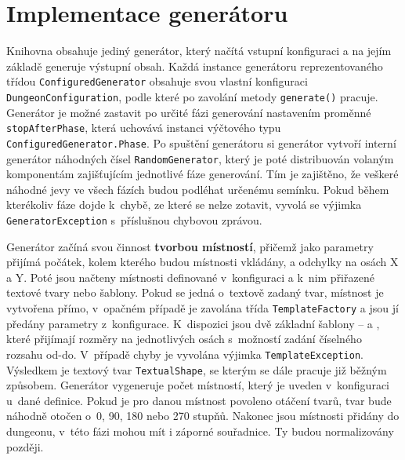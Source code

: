 
\section{Implementace generátoru}


\begin{sloppypar}
Knihovna obsahuje jediný generátor, který načítá vstupní konfiguraci a na jejím základě generuje výstupní obsah.
Každá instance generátoru reprezentovaného třídou \texttt{ConfiguredGenerator} obsahuje svou vlastní konfiguraci \texttt{DungeonConfiguration}, podle které po zavolání metody \texttt{generate()} pracuje.
Generátor je možné zastavit po určité fázi generování nastavením proměnné \texttt{stopAfterPhase}, která uchovává instanci výčtového typu \texttt{ConfiguredGenerator.Phase}.
Po spuštění generátoru si generátor vytvoří interní generátor náhodných čísel \texttt{RandomGenerator}, který je poté distribuován volaným komponentám zajišťujícím jednotlivé fáze generování.
Tím je zajištěno, že veškeré náhodné jevy ve všech fázích budou podléhat určenému semínku.
Pokud během kterékoliv fáze dojde k~chybě, ze které se nelze zotavit, vyvolá se výjimka \texttt{GeneratorException} s~příslušnou chybovou zprávou.
\end{sloppypar}
\par
Generátor začíná svou činnost \textbf{tvorbou místností}, přičemž jako parametry přijímá počátek, kolem kterého budou místnosti vkládány, a odchylky na osách X a Y.
Poté jsou načteny místnosti definované v~konfiguraci a k~nim přiřazené textové tvary nebo šablony.
Pokud se jedná o~textově zadaný tvar, místnost je vytvořena přímo, v~opačném případě je zavolána třída \texttt{TemplateFactory} a jsou jí předány parametry z~konfigurace.
K~dispozici jsou dvě základní šablony --  a , které přijímají rozměry na jednotlivých osách s~možností zadání číselného rozsahu od-do.
V~případě chyby je vyvolána výjimka \texttt{TemplateException}.
Výsledkem je textový tvar \texttt{TextualShape}, se kterým se dále pracuje již běžným způsobem.
Generátor vygeneruje počet místností, který je uveden v~konfiguraci u~dané definice.
Pokud je pro danou místnost povoleno otáčení tvarů, tvar bude náhodně otočen o~0, 90, 180 nebo 270 stupňů.
Nakonec jsou místnosti přidány do dungeonu, v~této fázi mohou mít i záporné souřadnice.
Ty budou normalizovány později.
